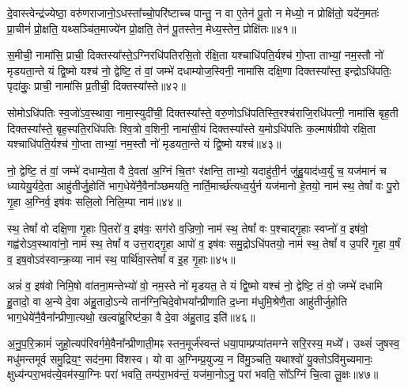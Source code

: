 दे॒वास्त्वेन्द्र॑ज्येष्ठा॒ वरु॑णराजानो॒\-ऽधस्ता᳚च्चो॒परि॑ष्टाच्च पान्तु॒ न वा ए॒तेन॑ पू॒तो न मेध्यो॒ न प्रोक्षि॑तो॒ यदे॑न॒मतः॑ प्रा॒चीनं॑ प्रो॒क्षति॒ यथ्सञ्चि॑त॒माज्ये॑न प्रो॒क्षति॒ तेन॑ पू॒तस्तेन॒ मेध्य॒स्तेन॒ प्रोक्षि॑तः॥४१॥

{\anuvakamend[{दु॒ध्रस्त॒नूर्\mbox{}ह॒विर्भा॑गाः पातु॒ द्वात्रिꣳ॑शच्च॥९॥}]}

स॒मीची॒ नामा॑सि॒ प्राची॒ दिक्तस्या᳚स्ते॒\-ऽग्निरधि॑पतिरसि॒तो र॑क्षि॒ता यश्चाधि॑पति॒र्यश्च॑ गो॒प्ता ताभ्यां॒ नम॒स्तौ नो॑ मृडयता॒न्ते यं द्वि॒ष्मो यश्च॑ नो॒ द्वेष्टि॒ तं वां॒ जम्भे॑ दधाम्योज॒स्विनी॒ नामा॑सि दक्षि॒णा दिक्तस्या᳚स्त॒ इन्द्रो\-ऽधि॑पतिः॒ पृदा॑कुः॒ प्राची॒ नामा॑सि प्र॒तीची॒ दिक्तस्या᳚स्ते॥४२॥

सोमो\-ऽधि॑पतिः स्व॒जो॑\-ऽव॒स्थावा॒ नामा॒स्युदी॑ची॒ दिक्तस्या᳚स्ते॒ वरु॒णो\-ऽधि॑पतिस्ति॒रश्च॑राजि॒रधि॑पत्नी॒ नामा॑सि बृह॒ती दिक्तस्या᳚स्ते॒ बृह॒स्पति॒रधि॑पतिः श्वि॒त्रो व॒शिनी॒ नामा॑सी॒यं दिक्तस्या᳚स्ते य॒मो\-ऽधि॑पतिः क॒ल्माष॑ग्रीवो रक्षि॒ता यश्चाधि॑पति॒र्यश्च॑ गो॒प्ता ताभ्यां॒ नम॒स्तौ नो॑ मृडयता॒न्ते यं द्वि॒ष्मो यश्च॑॥४३॥

नो॒ द्वेष्टि॒ तं वां॒ जम्भे॑ दधाम्ये॒ता वै दे॒वता॑ अ॒ग्निं चि॒तꣳ र॑क्षन्ति॒ ताभ्यो॒ यदाहु॑ती॒र्न जु॑हु॒याद॑ध्व॒र्युं च॒ यज॑मानं च ध्यायेयु॒र्यदे॒ता आहु॑तीर्जु॒होति॑ भाग॒धेये॑नै॒वैना᳚ञ्छमयति॒ नार्ति॒मार्च्छ॑त्यध्व॒र्युर्न यज॑मानो हे॒तयो॒ नाम॑ स्थ॒ तेषां᳚ वः पु॒रो गृ॒हा अ॒ग्निर्व॒ इष॑वः सलि॒लो निलि॒म्पा नाम॑॥४४॥

स्थ॒ तेषां᳚ वो दक्षि॒णा गृ॒हाः पि॒तरो॑ व॒ इष॑वः॒ सग॑रो व॒ज्रिणो॒ नाम॑ स्थ॒ तेषां᳚ वः प॒श्चाद्गृ॒हाः स्वप्नो॑ व॒ इष॑वो॒ गह्व॑रो\-ऽव॒स्थावा॑नो॒ नाम॑ स्थ॒ तेषां᳚ व उत्त॒राद्गृ॒हा आपो॑ व॒ इष॑वः समु॒द्रो\-ऽधि॑पतयो॒ नाम॑ स्थ॒ तेषां᳚ व उ॒परि॑ गृ॒हा व॒र्\mbox{}षं व॒ इष॒वो\-ऽव॑स्वान्क्र॒व्या नाम॑ स्थ॒ पार्थि॑वा॒स्तेषां᳚ व इ॒ह गृ॒हाः॥४५॥

अन्नं॑ व॒ इष॑वो निमि॒षो वा॑तना॒मन्तेभ्यो॑ वो॒ नम॒स्ते नो॑ मृडयत॒ ते यं द्वि॒ष्मो यश्च॑ नो॒ द्वेष्टि॒ तं वो॒ जम्भे॑ दधामि हु॒तादो॒ वा अ॒न्ये दे॒वा अ॑हु॒तादो॒\-ऽन्ये तान॑ग्नि॒चिदे॒वोभया᳚न्प्रीणाति द॒ध्ना म॑धुमि॒श्रेणै॒ता आहु॑तीर्जुहोति भाग॒धेये॑नै॒वैना᳚न्प्रीणा॒त्यथो॒ खल्वा॑हु॒रिष्ट॑का॒ वै दे॒वा अ॑हु॒ताद॒ इति॑॥४६॥

अ॒नु॒प॒रि॒क्रामं॑ जुहो॒त्यप॑रिवर्गमे॒वैना᳚न्प्रीणाती॒मꣴ स्तन॒मूर्ज॑स्वन्तं धया॒पाम्प्रप्या॑तमग्ने सरि॒रस्य॒ मध्ये᳚। उथ्सं॑ जुषस्व॒ मधु॑मन्तमूर्व समु॒द्रिय॒ꣳ॒ सद॑न॒मा वि॑शस्व। यो वा अ॒ग्निम्प्र॒युज्य॒ न वि॑मु॒ञ्चति॒ यथाश्वो॑ यु॒क्तो\-ऽवि॑मुच्यमानः॒ क्षुध्य॑न्परा॒भव॑त्ये॒वम॑स्या॒ग्निः परा॑ भवति॒ तम्प॑रा॒भव॑न्तं॒ यज॑मा॒नो\-ऽनु॒ परा॑ भवति॒ सो᳚\-ऽग्निं चि॒त्वा लू॒क्षः॥४७॥

